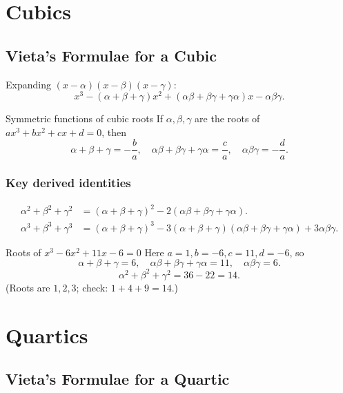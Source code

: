 \documentclass[12pt,a4paper]{article}
\theoremstyle{defstyle}
\begin{document}
\section{Cubics}

\subsection{Vieta's Formulae for a Cubic}

Expanding \((x-\alpha)(x-\beta)(x-\gamma)\):
\[
  x^3 - (\alpha+\beta+\gamma)x^2 + (\alpha\beta+\beta\gamma+\gamma\alpha)x - \alpha\beta\gamma.
\]

\begin{result}{Symmetric functions of cubic roots}{}
If \(\alpha,\beta,\gamma\) are the roots of \(ax^3+bx^2+cx+d=0\), then
\[
  \alpha+\beta+\gamma = -\frac{b}{a},\quad
  \alpha\beta+\beta\gamma+\gamma\alpha = \frac{c}{a},\quad
  \alpha\beta\gamma = -\frac{d}{a}.
\]
\end{result}

\subsubsection*{Key derived identities}
\[
\begin{aligned}
  \alpha^2+\beta^2+\gamma^2
    &= (\alpha+\beta+\gamma)^2 - 2(\alpha\beta+\beta\gamma+\gamma\alpha). \\[4pt]
  \alpha^3+\beta^3+\gamma^3
    &= (\alpha+\beta+\gamma)^3
       - 3(\alpha+\beta+\gamma)(\alpha\beta+\beta\gamma+\gamma\alpha)
       + 3\alpha\beta\gamma.
\end{aligned}
\]

\begin{example}{Roots of $x^3-6x^2+11x-6=0$}{}
Here \(a=1,b=-6,c=11,d=-6\), so
\[
  \alpha+\beta+\gamma=6,\quad
  \alpha\beta+\beta\gamma+\gamma\alpha=11,\quad
  \alpha\beta\gamma=6.
\]
\[
  \alpha^2+\beta^2+\gamma^2 = 36-22=14.
\]
(Roots are \(1,2,3\); check: \(1+4+9=14\).\;\checkmark)
\end{example}

\section{Quartics}

\subsection{Vieta's Formulae for a Quartic}
\end{document}
